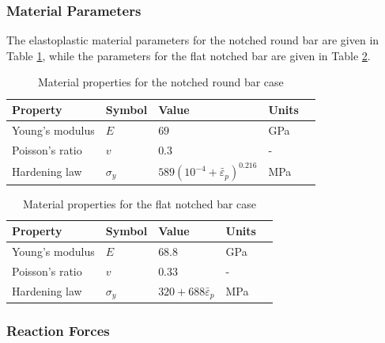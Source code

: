 \documentclass[sn-mathphys,Numbered]{sn-jnl}%
\begin{document}
\subsubsection{Material Parameters}

The elastoplastic material parameters for the notched round bar are given in Table \ref{tab:notched_bar_mat}, while the parameters for the flat notched bar are given in Table \ref{tab:flat_bar_mat}.
\begin{table}[htb]
	\centering
		\begin{tabular}{lllll} \hline
			Property & Symbol & Value  & Units \\ \hline 
			Young's modulus & $E$ & $69$ & GPa \\
			Poisson's ratio & $v$ & $0.3$  & - \\
			Hardening law & $\sigma_y$ & $589({10^{-4}+\bar{\varepsilon}}_p)^{0.216}$ & MPa  \\
			\hline
		\end{tabular}
	\caption{Material properties for the notched round bar case}
	\label{tab:notched_bar_mat}
\end{table}
\begin{table}[htb]
	\centering
		\begin{tabular}{lllll} \hline
			Property & Symbol & Value & Units  \\ \hline 
			Young's modulus & $E$ & $68.8$ & GPa \\
			Poisson's ratio & $v$ & $0.33$   & -\\
			Hardening law & $\sigma_y$ & $320+688\bar{\varepsilon}_p$ & MPa  \\
			\hline
		\end{tabular}
	\caption{Material properties for the flat notched bar case}
	\label{tab:flat_bar_mat}
\end{table}



\subsubsection{Reaction Forces}
\end{document}
